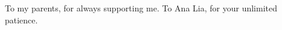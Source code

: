 \cleardoublepage
\thispagestyle{plain}

\vspace*{20cm}

\begin{flushright}
      To my parents, for always supporting me. To Ana Lia, for your unlimited patience.
    


\end{flushright}

